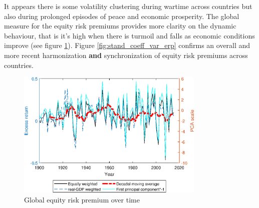 {{It appears there is some volatility clustering during wartime across countries but also during prolonged episodes of peace and economic prosperity. The global measure for the equity risk premiums provides more clarity on the dynamic behaviour, that is it's high when there is turmoil and falls as economic conditions improve (see figure \ref{fig:erp_global_time}). 
Figure \ref{fig:stand_coeff_var_erp} confirms an overall and more recent harmonization \textbf{and} synchronization of equity risk premiums across countries.

\begin{figure}[ht]
	\centering
  \includegraphics[width=0.8\textwidth]{Matlab Graphics/Figure_6_global_ERP}
	\caption{Global equity risk premium over time}
	\label{fig:erp_global_time}
\end{figure}

}}
